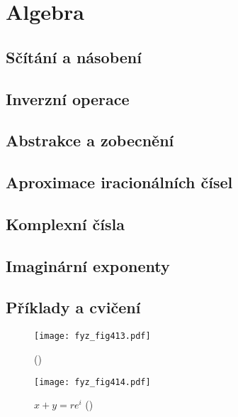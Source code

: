 \chapter{Algebra}\label{fyz:IchapXXII}
\minitoc
\section{Sčítání a násobení}\label{fyz:IchapXXIIsecI}
\section{Inverzní operace}\label{fyz:IchapXXIIsecII}
\section{Abstrakce a zobecnění}\label{fyz:IchapXXIIsecIII}
\section{Aproximace iracionálních čísel}\label{fyz:IchapXXIIsecIV}
\section{Komplexní čísla}\label{fyz:IchapXXIIsecV}
\section{Imaginární exponenty}\label{fyz:IchapXXIIsecVI}
\section{Příklady a cvičení}\label{fyz:IchapXXIIsecVIII}

  \begin{figure}[ht!] %
    \centering
    \texttt{[image: fyz\_fig413.pdf]}
    \caption{
             (\cite[s.~306]{Feynman01})}
    \label{fyz_fig413}
  \end{figure}

  \begin{figure}[ht!] %
    \centering
    \texttt{[image: fyz\_fig414.pdf]}
    \caption{\(x + y = re^i\)
             (\cite[s.~306]{Feynman01})}
    \label{fyz_fig414}
  \end{figure}
  
\printbibliography[title={Seznam literatury}, heading=subbibliography]
